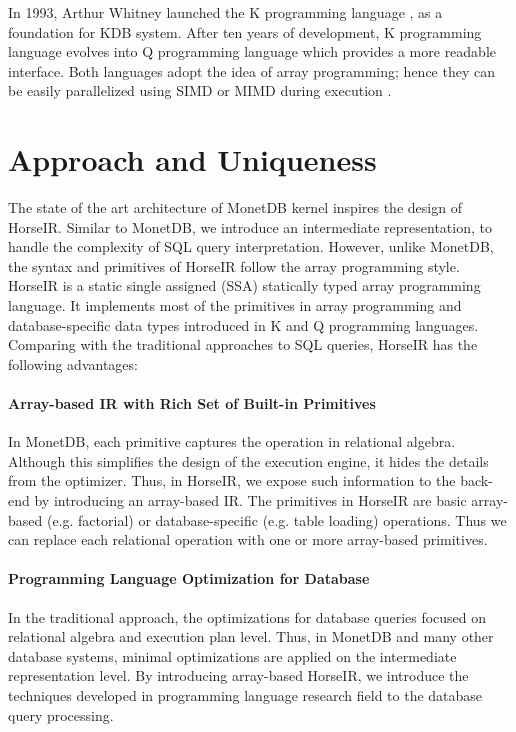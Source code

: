 \documentclass[sigplan]{acmart}
\begin{document}
In 1993, Arthur Whitney launched the K programming language
\cite{KLangTutorial} , as a foundation for KDB system. After ten years of
development, K programming language evolves into Q programming language
\cite{QLangTutorial} which provides a more readable interface. Both languages
adopt the idea of array programming; hence they can be easily parallelized
using SIMD or MIMD during execution \cite{HowFastCanAPLBe}. 



\section{Approach and Uniqueness}

The state of the art architecture of MonetDB kernel inspires the design of
HorseIR. Similar to MonetDB, we introduce an intermediate representation, to
handle the complexity of SQL query interpretation.  However, unlike MonetDB,
the syntax and primitives of HorseIR follow the array programming style. HorseIR is a
static single assigned (SSA) statically typed array programming language. It
implements most of the primitives in array programming and database-specific
data types introduced in K and Q programming languages. Comparing with the
traditional approaches to SQL queries, HorseIR has the following advantages:

\paragraph{Array-based IR with Rich Set of Built-in Primitives}
In MonetDB, each primitive captures the operation in relational algebra.
Although this simplifies the design of the execution engine, it hides the
details from the optimizer. Thus, in HorseIR, we expose such information to the
back-end by introducing an array-based IR. The primitives in HorseIR are basic
array-based (e.g. factorial) or database-specific (e.g.
table loading) operations. Thus we can replace each relational operation with
one or more array-based primitives. 

\paragraph{Programming Language Optimization for Database}
In the traditional approach, the optimizations for database queries focused
on relational algebra and execution plan level. Thus, in MonetDB and many other
database systems, minimal optimizations are applied on the intermediate
representation level. By introducing array-based HorseIR, we introduce the
techniques developed in programming language research field to the database
query processing.
\end{document}
